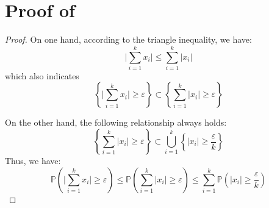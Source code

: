 \documentclass{article}
\begin{document}
\section{Proof of }\label{proof:1/nepsilon}
\begin{proof}
On one hand, according to the triangle inequality, we have:
\begin{equation}
    \Bigg|\sum_{i=1}^{k}x_i\Bigg| \leq \sum_{i=1}^{k}|x_i|
\end{equation}
which also indicates
\begin{equation}
    \left\{\Bigg|\sum_{i=1}^{k}x_i\Bigg| \geq \varepsilon\right\} \subset \left\{\sum_{i=1}^{k}|x_i| \geq \varepsilon\right\}
\end{equation}

On the other hand, the following relationship always holds:
\begin{equation}
    \left\{\sum_{i=1}^{k}|x_i| \geq \varepsilon\right\} \subset \bigcup_{i=1}^k \left\{|x_i| \geq \frac{\varepsilon}{k}\right\}
\end{equation}
Thus, we have:
\begin{equation}
    \mathbb{P}\left(\Bigg|\sum_{i=1}^{k}x_i\Bigg| \geq \varepsilon\right) \leq \mathbb{P}\left(\sum_{i=1}^{k}|x_i| \geq \varepsilon\right) \leq \sum_{i=1}^{k}\mathbb{P}\left(|x_i| \geq \frac{\varepsilon}{k}\right)
\end{equation}

\end{proof}





\appendix
\end{document}
